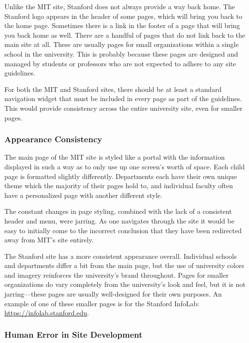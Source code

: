 Unlike the MIT site, Stanford does not always provide a way back home. The Stanford
logo appears in the header of some pages, which will bring you back to the home
page. Sometimes there is a link in the footer of a page that will bring you back
home as well. There are a handful of pages that do not link back to the main
site at all. These are usually pages for small organizations within a single
school in the university. This is probably because these pages are designed and
managed by students or professors who are not expected to adhere to any site
guidelines.

For both the MIT and Stanford sites, there should be at least a standard navigation
widget that must be included in every page as part of the guidelines. This would
provide consistency across the entire university site, even for smaller pages.

\subsubsection*{Appearance Consistency}

The main page of the MIT site is styled like a portal with the information displayed in such a way as to
only use up one screen's worth of space. Each child page is formatted slightly differently.
Departments each have their own unique theme which the majority of their pages hold to, and
individual faculty often have a personalized page with another different style.

The constant changes in page styling, combined with the lack of a consistent header and
menu, were jarring. As one navigates through the site it would be easy to initially
come to the incorrect conclusion that they have been redirected away from MIT's site entirely.

The Stanford site has a more consistent appearance overall. Individual schools and
departments differ a bit from the main page, but the use of university colors and imagery
reinforces the university's brand throughout. Pages for smaller organizations do
vary completely from the university's look and feel, but it is not jarring---these
pages are usually well-designed for their own purposes. An example of one of these
smaller pages is for the Stanford InfoLab: \url{https://infolab.stanford.edu}.

\subsubsection*{Human Error in Site Development}

